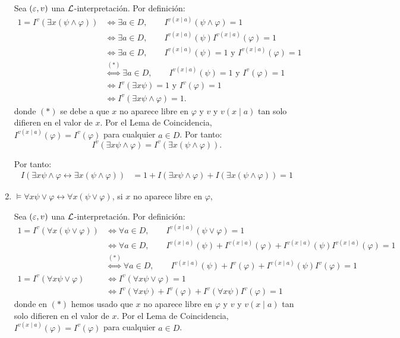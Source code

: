 \begin{ejercicio}
\begin{enumerate}
        Sea $(\varepsilon,v)$ una $\mathcal{L}$-interpretación. Por definición:
        \begin{align*}
            1 = I^v(\exists x(\psi \wedge \varphi))
            &\iff \exists a\in D,\qquad I^{v(x\mid a)}(\psi \wedge \varphi) = 1\\
            &\iff \exists a\in D,\qquad I^{v(x\mid a)}(\psi)I^{v(x\mid a)}(\varphi) = 1\\
            &\iff \exists a\in D,\qquad I^{v(x\mid a)}(\psi) = 1\text{ y }I^{v(x\mid a)}(\varphi) = 1\\
            &\stackrel{(\ast)}{\iff} \exists a\in D,\qquad I^{v(x\mid a)}(\psi) = 1\text{ y }I^{v}(\varphi) = 1\\
            &\iff I^v(\exists x\psi)=1\text{ y }I^v(\varphi)=1\\
            &\iff I^v(\exists x\psi\wedge\varphi)=1.
        \end{align*}
        donde $(\ast)$ se debe a que $x$ no aparece libre en $\varphi$ y $v$ y $v(x\mid a)$ tan solo difieren en el valor de $x$. Por el Lema de Coincidencia, $I^{v(x\mid a)}(\varphi) = I^v(\varphi)$ para cualquier $a\in D$.
        Por tanto:
        \begin{equation*}
            I^v(\exists x \psi \wedge \varphi) = I^v(\exists x(\psi \wedge \varphi)).
        \end{equation*}

        Por tanto:
        \begin{align*}
            I( \exists x \psi \wedge \varphi \leftrightarrow \exists x(\psi \wedge \varphi))
            &= 1+I(\exists x \psi \wedge \varphi)+I(\exists x(\psi \wedge \varphi))=1
        \end{align*}
        \item $\models \forall x \psi \vee \varphi \leftrightarrow \forall x(\psi \vee \varphi)$, si $x$ no aparece libre en $\varphi$,
        
        Sea $(\varepsilon,v)$ una $\mathcal{L}$-interpretación. Por definición:
        \begin{align*}
            1 = I^v(\forall x(\psi \vee \varphi))
            &\iff \forall a\in D,\qquad I^{v(x\mid a)}(\psi \vee \varphi) = 1\\
            &\iff \forall a\in D,\qquad I^{v(x\mid a)}(\psi) + I^{v(x\mid a)}(\varphi) + I^{v(x\mid a)}(\psi)I^{v(x\mid a)}(\varphi) = 1\\
            &\stackrel{(\ast)}{\iff} \forall a\in D,\qquad I^{v(x\mid a)}(\psi) + I^{v}(\varphi) + I^{v(x\mid a)}(\psi)I^{v}(\varphi) = 1\\
            1 = I^v(\forall x \psi \vee \varphi)
            &\iff I^v(\forall x \psi \vee \varphi) = 1\\
            &\iff I^v(\forall x \psi) + I^v(\varphi) + I^v(\forall x \psi)I^v(\varphi) = 1
        \end{align*}
        donde en $(\ast)$ hemos usado que $x$ no aparece libre en $\varphi$ y $v$ y $v(x\mid a)$ tan solo difieren en el valor de $x$. Por el Lema de Coincidencia, $I^{v(x\mid a)}(\varphi) = I^v(\varphi)$ para cualquier $a\in D$.


\end{enumerate}
\end{ejercicio}
